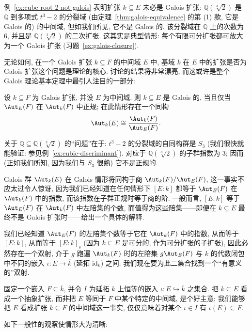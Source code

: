 例~\ref{ex:cube-root-2-not-galois} 表明扩张 $k\subseteq E$ 未必是 Galois 扩张: $\mathbb{Q}(\sqrt[3]{2})$ 是 $\mathbb{Q}$ 到多项式 $t^3-2$ 的分裂域 (由定理~\ref{thm:galois-equivalence} 的第 (1) 款, 它是 Galois 的) 的中间域, 但如我们所见, 它不是 Galois 的. 该分裂域在 $\mathbb{Q}$ 上的次数为 $6$, 并且是 $\mathbb{Q}(\sqrt[3]{2})$ 的二次扩张. 这其实是典型情形: 每个有限可分扩张都可放大为一个 Galois 扩张 (习题~\ref{ex:galois-closure}).

无论如何, 在一个 Galois 扩张 $k\subseteq F$ 的中间域 $E$ 中, 基域 $k$ 在 $E$ 中的扩张是否为 Galois 扩张这个问题是理论的核心. 讨论的结果将非常漂亮, 而这或许是整个 Galois 理论基本定理中最引人注目的一部分:

\begin{theorem}\label{thm:ft-galois-II}
设 $k\subseteq F$ 为 Galois 扩张, 并设 $E$ 为中间域. 则 $k\subseteq E$ 是 Galois 的, 当且仅当 $\Aut_E(F)$ 在 $\Aut_k(F)$ 中正规; 在此情形存在一个同构
\[
\Aut_k(E)\cong\frac{\Aut_k(F)}{\Aut_E(F)}.
\]
\end{theorem}

关于 $\mathbb{Q}\subseteq\mathbb{Q}(\sqrt[3]{2})$ 的``问题''在于: $t^3-2$ 的分裂域的自同构群是 $S_3$ (我们很快就能验证: 参见例~\ref{ex:cubic-discriminant}). 对应于 $\mathbb{Q}(\sqrt[3]{2})$ 的子群指数为 $3$; 因而 (正如我们所知, 因为我们与 $S_3$ 很熟) 它不是正规的.

Galois 群 $\Aut_k(E)$ 在 Galois 情形将同构于商 $\Aut_k(F)/\Aut_E(F)$, 这一事实不应太过令人惊讶, 因为我们已经知道在任何情形下 $[E:k]$ 都等于 $\Aut_E(F)$ 在 $\Aut_k(F)$ 中的指数, 而该指数在子群正规时等于商的阶. 一般而言, $[E:k]$ 等于 $\Aut_E(F)$ 在 $\Aut_k(F)$ 中左陪集的个数, 而值得为这些陪集——即便在 $k\subseteq E$ 最终不是 Galois 扩张时——给出一个具体的解释.

我们已经知道 $\Aut_E(F)$ 的左陪集个数等于它在 $\Aut_k(F)$ 中的指数, 从而等于 $[E:k]$, 从而等于 $[E:k]_s$ (因为 $k\subseteq E$ 是可分的, 作为可分扩张的子扩张), 因此必然存在一个双射, 介于 $g$ 跑遍 $\Aut_k(F)$ 时的左陪集 $g\Aut_E(F)$ 与 $k$ 的代数闭包中不同的嵌入 $\iota:E\to\overline{k}$ (延拓 $\mathrm{id}_k$) 之间. 我们现在要为此二集合找到一个``有意义的''双射.

固定一个嵌入 $F\subseteq\overline{k}$, 并令 $I$ 为延拓 $k$ 上恒等的嵌入 $\iota:E\hookrightarrow\overline{k}$ 之集合. 把 $k\subseteq E$ 看成一个抽象扩张, 而非把 $E$ 等同于 $F$ 中某个特定的中间域, 是个好主意; 我们能够把 $E$ 看成扩张 $k\subseteq F$ 的中间域这一事实, 仅仅意味着对某个 $\iota\in I$ 有 $\iota(E)\subseteq F$.

如下一般性的观察使情形大为清晰:

